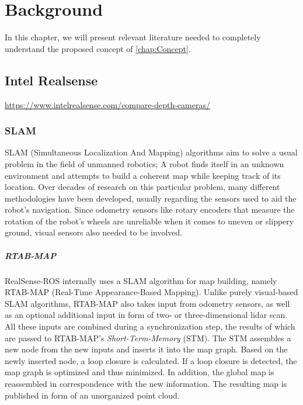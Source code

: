 \documentclass[main.tex]{subfiles}
\begin{document}
\chapter{Background}\label{chap:Background}
In this chapter, we will present relevant literature needed to completely understand the proposed concept of \autoref{chap:Concept}.


\section{Intel Realsense}
\href{https://www.intelrealsense.com/compare-depth-cameras/}{https://www.intelrealsense.com/compare-depth-cameras/}

\subsection*{SLAM}
SLAM (Simultaneous Localization And Mapping) algorithms aim to solve a usual problem in the field of unmanned robotics;
A robot finds itself in an unknown environment and attempts to build a coherent map while keeping track of its location.
Over decades of research on this particular problem, many different methodologies have been developed, usually regarding the sensors used to aid the robot's navigation.
Since odometry sensors like rotary encoders that measure the rotation of the robot's wheels are unreliable when it comes to uneven or slippery ground, visual sensors also needed to be involved.

\paragraph*{RTAB-MAP}
RealSense-ROS internally uses a SLAM algorithm for map building, namely RTAB-MAP (Real-Time Appearance-Based Mapping)\cite{Labbé_Michaud_2019}.
Unlike purely visual-based SLAM algorithms, RTAB-MAP also takes input from odometry sensors, as well as an optional additional input in form of two- or three-dimensional 
lidar scan.
All these inputs are combined during a synchronization step, the results of which are passed to RTAB-MAP's \textit{Short-Term-Memory} (STM).
The STM assembles a new node from the new inputs and inserts it into the map graph. Based on the newly inserted node, a loop closure is calculated.
If a loop closure is detected, the map graph is optimized and thus minimized. In addition, the global map is reassembled in correspondence with the new information.
The resulting map is published in form of an unorganized point cloud.
\end{document}
